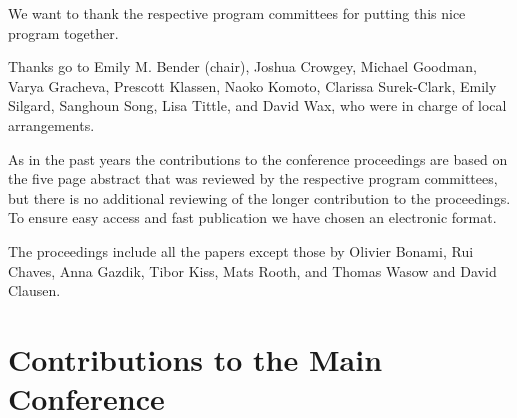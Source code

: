 \documentclass[11pt,a4paper,fleqn]{article}
\begin{document}
%
We want to thank the respective program committees for putting this nice program together.



Thanks go to Emily M. Bender (chair), Joshua Crowgey,
Michael Goodman,
Varya Gracheva,
Prescott Klassen,
Naoko Komoto,
Clarissa Surek-Clark,
Emily Silgard,
Sanghoun Song,
Lisa Tittle, and David Wax, who were in charge of local arrangements.


As in the past years the contributions to the conference proceedings are based on the five page abstract
that was reviewed by the respective program committees, but there is no additional reviewing of the
longer contribution to the proceedings.
To ensure easy access and fast publication we have chosen an electronic format.


The proceedings include all the papers except those by Olivier Bonami, Rui Chaves, Anna Gazdik,
Tibor Kiss, Mats Rooth, and Thomas Wasow and David Clausen.


\newpage
\part{Contributions to the Main Conference}
\thispagestyle{empty}
\newpage
        \setcounter{page}{6}
\thispagestyle{empty}
\end{document}
